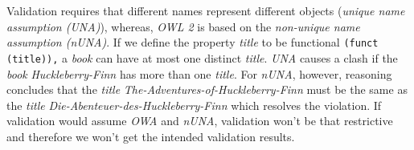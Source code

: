 \documentclass[a4paper,fontsize=11pt]{scrartcl}
\newcommand{\ms}[1]{\texttt{#1}}
\begin{document}
Validation requires that different names represent different objects (\emph{unique name assumption (UNA)}), whereas,
\emph{OWL 2} is based on the {\em non-unique name assumption (nUNA)}.  
If we define the property \emph{title} to be functional {\small\ms{(funct (title)),}} a \emph{book} can have at most one distinct \emph{title}.
\emph{UNA} causes a clash
if the \emph{book} {\em Huckleberry-Finn} has more than one \emph{title}.
For \emph{nUNA}, however, reasoning concludes that the \emph{title} {\em The-Adventures-of-Huckleberry-Finn} must be the same as the \emph{title} {\em Die-Abenteuer-des-Huckleberry-Finn} 
which resolves the violation. 
If validation would assume \emph{OWA} and \emph{nUNA}, validation won’t be that restrictive and therefore we won’t get the intended validation results.
\end{document}
